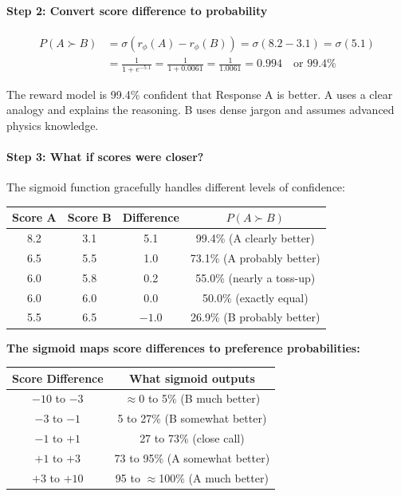 \begin{chapterenv}
\paragraph{Step 2: Convert score difference to probability}

\begin{align*}
P(A \succ B) &= \sigma(r_\phi(A) - r_\phi(B)) = \sigma(8.2 - 3.1) = \sigma(5.1) \\
&= \frac{1}{1 + e^{-5.1}} = \frac{1}{1 + 0.0061} = \frac{1}{1.0061} = 0.994 \quad \text{or } 99.4\%
\end{align*}

\begin{tipbox}
The reward model is 99.4\% confident that Response A is better. A uses a clear analogy and explains the reasoning. B uses dense jargon and assumes advanced physics knowledge.
\end{tipbox}

\paragraph{Step 3: What if scores were closer?}

The sigmoid function gracefully handles different levels of confidence:

\begin{center}
\begin{tabular}{cccc}
\toprule
\textbf{Score A} & \textbf{Score B} & \textbf{Difference} & \textbf{$P(A \succ B)$} \\
\midrule
8.2 & 3.1 & 5.1 & 99.4\% (A clearly better) \\
6.5 & 5.5 & 1.0 & 73.1\% (A probably better) \\
6.0 & 5.8 & 0.2 & 55.0\% (nearly a toss-up) \\
6.0 & 6.0 & 0.0 & 50.0\% (exactly equal) \\
5.5 & 6.5 & $-1.0$ & 26.9\% (B probably better) \\
\bottomrule
\end{tabular}
\end{center}

\textbf{The sigmoid maps score differences to preference probabilities:}

\begin{center}
\begin{tabular}{cc}
\toprule
\textbf{Score Difference} & \textbf{What sigmoid outputs} \\
\midrule
$-10$ to $-3$ & $\approx$0 to 5\% (B much better) \\
$-3$ to $-1$ & 5 to 27\% (B somewhat better) \\
$-1$ to $+1$ & 27 to 73\% (close call) \\
$+1$ to $+3$ & 73 to 95\% (A somewhat better) \\
$+3$ to $+10$ & 95 to $\approx$100\% (A much better) \\
\bottomrule
\end{tabular}
\end{center}


\end{chapterenv}
